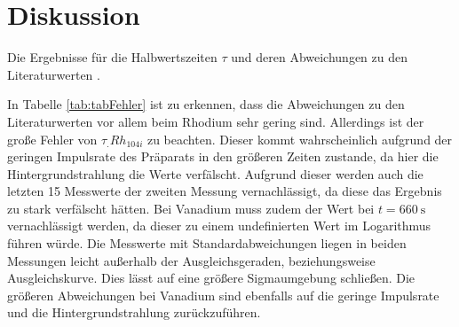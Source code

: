 
\section{Diskussion}
\label{sec:Diskussion}

\begin{table}
	\centering
	\caption{Die Ergebnisse für die Halbwertszeiten $\tau$ und deren Abweichungen zu den Literaturwerten\cite{Halbwertszeiten} .}
	
	\label{tab:tabFehler}
\end{table}

\noindent In Tabelle \ref{tab:tabFehler} ist zu erkennen, dass die Abweichungen zu den Literaturwerten vor allem beim Rhodium sehr gering sind. Allerdings ist der große Fehler von $\tau_.{Rh_{104i}}$ zu beachten. Dieser kommt wahrscheinlich aufgrund der geringen Impulsrate des Präparats in den größeren Zeiten zustande, da hier die Hintergrundstrahlung die Werte verfälscht. Aufgrund dieser werden auch die letzten 15 Messwerte der zweiten Messung vernachlässigt, da diese das Ergebnis zu stark verfälscht hätten. Bei Vanadium muss zudem der Wert bei $t=\SI{660}{\second}$ vernachlässigt werden, da dieser zu einem undefinierten Wert im Logarithmus führen würde. Die Messwerte mit Standardabweichungen liegen in beiden Messungen leicht außerhalb der Ausgleichsgeraden, beziehungsweise Ausgleichskurve. Dies lässt auf eine größere Sigmaumgebung schließen. Die größeren Abweichungen bei Vanadium sind ebenfalls auf die geringe Impulsrate und die Hintergrundstrahlung zurückzuführen.       
